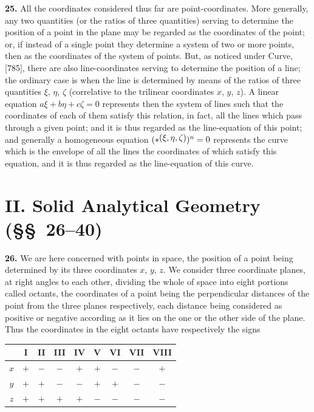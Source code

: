 \documentclass[11pt,a4paper]{article}
\theoremstyle{definition}
\begin{document}
\textbf{25.} All the coordinates considered thus far are point-coordinates. More generally, any two quantities (or the ratios of three quantities) serving to determine the position of a point in the plane may be regarded as the coordinates of the point; or, if instead of a single point they determine a system of two or more points, then as the coordinates of the system of points. But, as noticed under Curve, [785], there are also line-coordinates serving to determine the position of a line; the ordinary case is when the line is determined by means of the ratios of three quantities $\xi$, $\eta$, $\zeta$ (correlative to the trilinear coordinates $x$, $y$, $z$). A linear equation $a\xi+b\eta+c\zeta=0$ represents then the system of lines such that the coordinates of each of them satisfy this relation, in fact, all the lines which pass through a given point; and it is thus regarded as the line-equation of this point; and generally a homogeneous equation $(*\,\raisebox{0.5ex}{\text{$\!(\xi,\eta,\zeta)$}})^n=0$ represents the curve which is the envelope of all the lines the coordinates of which satisfy this equation, and it is thus regarded as the line-equation of this curve.

\section*{II. Solid Analytical Geometry (\S\S\ 26--40)}

\textbf{26.} We are here concerned with points in space, the position of a point being determined by its three coordinates $x$, $y$, $z$. We consider three coordinate planes, at right angles to each other, dividing the whole of space into eight portions called octants, the coordinates of a point being the perpendicular distances of the point from the three planes respectively, each distance being considered as positive or negative according as it lies on the one or the other side of the plane. Thus the coordinates in the eight octants have respectively the signs
\begin{center}
\begin{tabular}{c|cccccccc}
& I & II & III & IV & V & VI & VII & VIII \\
\hline
$x$ & $+$ & $-$ & $-$ & $+$ & $+$ & $-$ & $-$ & $+$ \\
$y$ & $+$ & $+$ & $-$ & $-$ & $+$ & $+$ & $-$ & $-$ \\
$z$ & $+$ & $+$ & $+$ & $+$ & $-$ & $-$ & $-$ & $-$ \\
\end{tabular}
\end{center}
\end{document}
